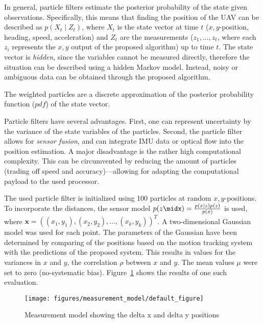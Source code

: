 In general, particle filters estimate the posterior probability of the
state given observations. Specifically, this means that finding the
position of the UAV can be described as $p(X_t \mid Z_t)$, where $X_t$
is the state vector at time $t$ ($x,y$-position, heading, speed,
acceleration) and $Z_t$ are the measurements ($z_1, ..., z_t$, where
each $z_i$ represents the $x,y$ output of the proposed algorithm) up
to time $t$. The state vector is \emph{hidden}, since the variables
cannot be measured directly, therefore the situation can be described
using a hidden Markov model. Instead, noisy or ambiguous data can be
obtained through the proposed algorithm.

The weighted particles are a discrete approximation of the posterior
probability function ($pdf$) of the state vector.

Particle filters have several advantages. First, one can represent
uncertainty by the variance of the state variables of the
particles. Second, the particle filter allows for \emph{sensor fusion}, and
can integrate IMU data or optical flow into the position estimation.
A major disadvantage is the rather high computational complexity. This
can be circumvented by reducing the amount of particles (trading off
speed and accuracy)---allowing for adapting the computational payload
to the used processor.

The used particle filter is initialized using 100 particles at random
$x, y$-positions. To incorporate the distances, the sensor model $p(z
\midx) = \frac{p(x \mid z)p(z)}{p(x)}$ is used, where $\textbf{x} =
((x_1, y_1), (x_2, y_2), \ldots, (x_k, y_k))^T$. A two-dimensional
Gaussian model was used for each point. The parameters of the Gaussian
have been determined by comparing of the positions based on the motion
tracking system with the predictions of the proposed system. This
results in values for the variances in $x$ and $y$, the correlation
$\rho$ between $x$ and $y$. The mean values $\mu$ were set to zero
(no-systematic bias). Figure~\ref{fig:measurementmodel} shows the
results of one such evaluation.

\begin{figure}[h!]
\begin{center}
\texttt{[image: figures/measurement\_model/default\_figure]}
\caption{{\label{fig:measurementmodel} Measurement model showing the delta x and delta y
    positions%
}}
\end{center}
\end{figure}

